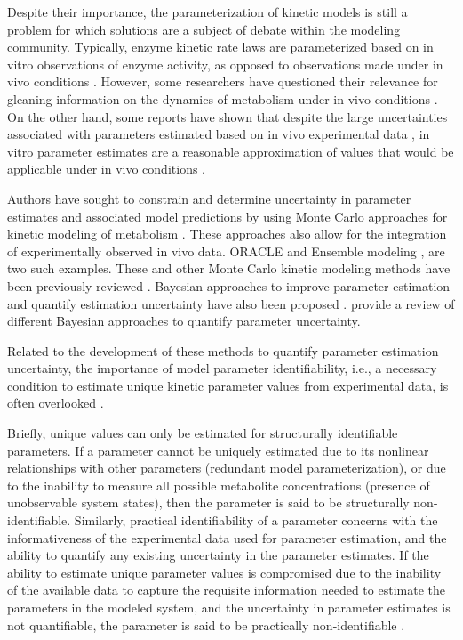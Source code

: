 \documentclass[10pt]{article}
\begin{document}
	Despite their importance, the parameterization of kinetic models is still a problem for which solutions are a subject of debate within the modeling community. Typically, enzyme kinetic rate laws are parameterized based on in vitro observations of enzyme activity, as opposed to observations made under in vivo conditions \parencite{Heijnen2005,Smallbone2007}. However, some researchers have questioned their relevance for gleaning information on the dynamics of metabolism under in vivo conditions \parencite{Heijnen2005,Heijnen2013}. On the other hand, some reports have shown that despite the large uncertainties associated with parameters estimated based on in vivo experimental data \parencite{Link2014}, in vitro parameter estimates are a reasonable approximation of values that would be applicable under in vivo conditions \parencite{Davidi2016}. 
	
	 Authors have sought to constrain and determine uncertainty in parameter estimates and associated model predictions by using Monte Carlo approaches for kinetic modeling of metabolism \parencite{Andreozzi2016a}. These approaches also allow for the integration of experimentally observed in vivo data. ORACLE \parencite{Wang2004} and Ensemble modeling \parencite{Tran2008}, are two such examples. These and other Monte Carlo kinetic modeling methods have been previously reviewed \parencite{Srinivasan2015}. 	 
	 Bayesian approaches to improve parameter estimation and quantify estimation uncertainty have also been proposed \parencite{Saa2016}. \textcite{Vanlier2013} provide a review of different Bayesian approaches to quantify parameter uncertainty.	 
	
	Related to the development of these methods to quantify parameter estimation uncertainty, the importance of model parameter identifiability, i.e., a necessary condition to estimate unique kinetic parameter values from experimental data, is often overlooked \parencite{Ljung1994,Berthoumieux2013}. 
	
	Briefly, unique values can only be estimated for structurally identifiable parameters. If a parameter cannot be uniquely estimated due to its nonlinear relationships with other parameters (redundant model parameterization), or due to the inability to measure all possible metabolite concentrations (presence of unobservable system states), then the parameter is said to be structurally non-identifiable. Similarly, practical identifiability of a parameter concerns with the informativeness of the experimental data used for parameter estimation, and the ability to quantify any existing uncertainty in the parameter estimates. If the ability to estimate unique parameter values is compromised due to the inability of the available data to capture the requisite information needed to estimate the parameters in the modeled system, and the uncertainty in parameter estimates is not quantifiable, the parameter is said to be practically non-identifiable \parencite{Ljung1994,Rodriguez-Fernandez2006}. 	
	
\end{document}
